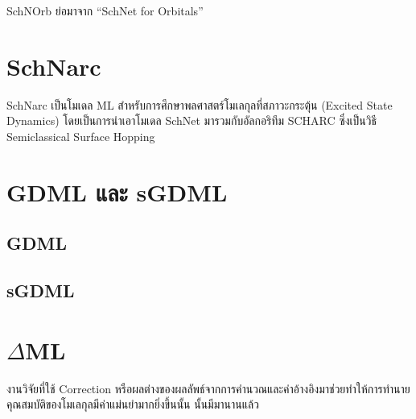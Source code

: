 SchNOrb ย่อมาจาก \enquote{SchNet for Orbitals}\autocite{schutt2019a}

\section{SchNarc}
\label{sec:schnarc}

SchNarc เป็นโมเดล ML สำหรับการศึกษาพลศาสตร์โมเลกุลที่สภาวะกระตุ้น (Excited State Dynamics)\autocite{westermayr2020} 
โดยเป็นการนำเอาโมเดล SchNet\autocite{schutt2017,schutt2018} มารวมกับอัลกอริทึม SCHARC\autocite{richter2011,mai2018} 
ซึ่งเป็นวิธี Semiclassical Surface Hopping

\section{GDML และ sGDML}
\label{sec:gdml_sgdml}

\subsection{GDML}
\label{ssec:gdml}

\autocite{chmiela2017}

\subsection{sGDML}
\label{ssec:sgdml}

\autocite{chmiela2018}

\autocite{sauceda2020}

\section{\texorpdfstring{$\Delta$}-ML}
\label{sec:delta_ML}

งานวิจัยที่ใช้ Correction หรือผลต่างของผลลัพธ์จากการคำนวณและค่าอ้างอิงมาช่วยทำให้การทำนายคุณสมบัติของโมเลกุลมีค่าแม่นยำมากยิ่งขึ้นนั้น%
นั้นมีมานานแล้ว\autocite{hu2003,wu2007,balabin2009}

